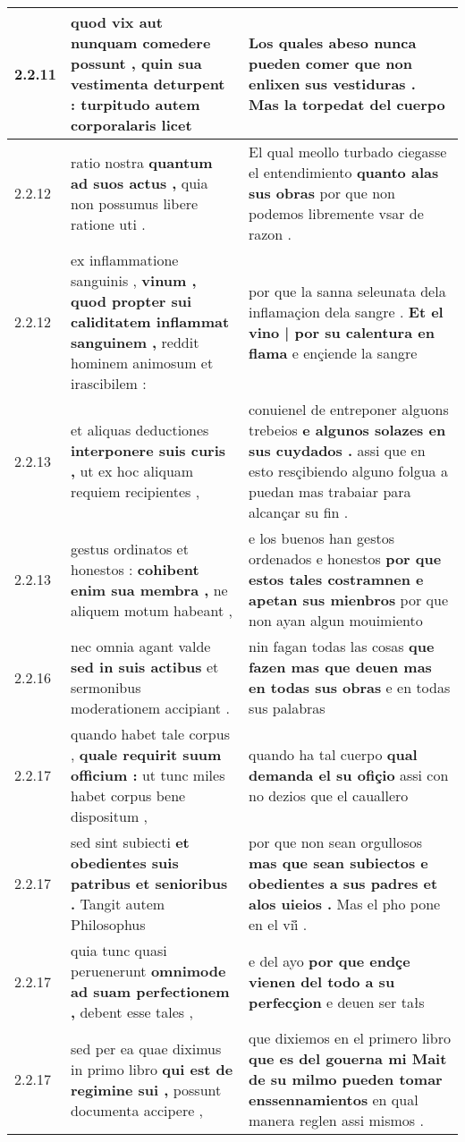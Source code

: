 \begin{tabular}{|p{1cm}|p{6.5cm}|p{6.5cm}|}
2.2.11 & quod vix aut nunquam comedere possunt , \textbf{ quin sua vestimenta deturpent : } turpitudo autem corporalaris licet & Los quales abeso nunca pueden comer \textbf{ que non enlixen sus vestiduras . } Mas la torpedat del cuerpo \\\hline
2.2.12 & ratio nostra \textbf{ quantum ad suos actus , } quia non possumus libere ratione uti . & El qual meollo turbado ciegasse el entendimiento \textbf{ quanto alas sus obras } por que non podemos libremente vsar de razon . \\\hline
2.2.12 & ex inflammatione sanguinis , \textbf{ vinum , quod propter sui caliditatem inflammat sanguinem , } reddit hominem animosum et irascibilem : & por que la sanna seleunata dela inflamaçion dela sangre . \textbf{ Et el vino | por su calentura en flama } e ençiende la sangre \\\hline
2.2.13 & et aliquas deductiones \textbf{ interponere suis curis , } ut ex hoc aliquam requiem recipientes , & conuienel de entreponer alguons trebeios \textbf{ e algunos solazes en sus cuydados . } assi que en esto resçibiendo alguno folgua a puedan mas trabaiar para alcançar su fin . \\\hline
2.2.13 & gestus ordinatos et honestos : \textbf{ cohibent enim sua membra , } ne aliquem motum habeant , & e los buenos han gestos ordenados e honestos \textbf{ por que estos tales costramnen e apetan sus mienbros } por que non ayan algun mouimiento \\\hline
2.2.16 & nec omnia agant valde \textbf{ sed in suis actibus } et sermonibus moderationem accipiant . & nin fagan todas las cosas \textbf{ que fazen mas que deuen mas en todas sus obras } e en todas sus palabras \\\hline
2.2.17 & quando habet tale corpus , \textbf{ quale requirit suum officium : } ut tunc miles habet corpus bene dispositum , & quando ha tal cuerpo \textbf{ qual demanda el su ofiçio } assi con no dezios que el cauallero \\\hline
2.2.17 & sed sint subiecti \textbf{ et obedientes suis patribus et senioribus . } Tangit autem Philosophus & por que non sean orgullosos \textbf{ mas que sean subiectos e obedientes a sus padres et alos uieios . } Mas el pho pone en el vii̊ . \\\hline
2.2.17 & quia tunc quasi peruenerunt \textbf{ omnimode ad suam perfectionem , } debent esse tales , & e del ayo \textbf{ por que endçe vienen del todo a su perfecçion } e deuen ser tałs \\\hline
2.2.17 & sed per ea quae diximus in primo libro \textbf{ qui est de regimine sui , } possunt documenta accipere , & que dixiemos en el primero libro \textbf{ que es del gouerna mi Mait de su milmo pueden tomar enssennamientos } en qual manera reglen assi mismos . \\\hline

\end{tabular}
